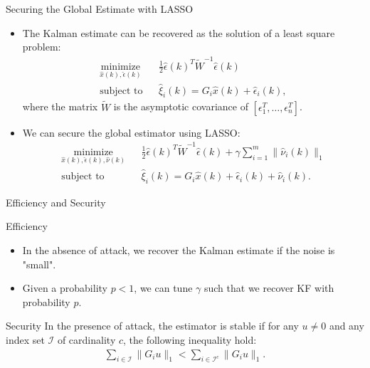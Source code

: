 \documentclass[10pt]{beamer}
\DeclareMathOperator{\1}{\textbf{1}}
\begin{document}
\begin{frame}{Securing the Global Estimate with LASSO}
  \begin{itemize}
    \item The Kalman estimate can be recovered as the solution of a least square problem:
      \begin{align*}
      &\mathop{\textrm{minimize}}\limits_{\hat x(k),\hat \epsilon(k)}&
      & \frac{1}{2}\hat \epsilon(k)^T \tilde W^{-1} \hat \epsilon(k)\\
      &\textrm{subject to} &
      &\hat \xi_i(k)  =  G_i\hat x(k) + \hat \epsilon_i(k),&
      \end{align*}
      where the matrix $\tilde W$ is the asymptotic covariance of $[\epsilon_1^T,\ldots ,\epsilon_n^T]$.
 
    \item We can secure the global estimator using LASSO:
      \begin{align*}
    &\mathop{\textrm{minimize}}\limits_{\hat x(k),\hat \epsilon(k), \hat \nu(k)}&
    & \frac{1}{2}\hat \epsilon(k)^T \tilde W^{-1} \hat \epsilon(k) + \gamma \sum_{i=1}^m \|\hat \nu_i(k)\|_1\\
    &\textrm{subject to} &
    &\hat \xi_i(k)  =  G_i\hat x(k) + \hat \epsilon_i(k)+\hat \nu_i(k).&
      \end{align*}
  \end{itemize}
\end{frame}

\begin{frame}{Efficiency and Security}
  \begin{block}{Efficiency}
    \begin{itemize}
      \item In the absence of attack, we recover the Kalman estimate if the noise is "small".
      \item Given a probability $p<1$, we can tune $\gamma$ such that we recover KF with probability $p$.
    \end{itemize}
  \end{block}
  \begin{block}{Security}
    In the presence of attack, the estimator is stable if for any $u\neq 0$ and any index set $\mathcal I$ of cardinality $c$, the following inequality hold:
    \begin{align*}
      \sum_{i\in \mathcal I} \|G_iu\|_1 < \sum_{i\in \mathcal I^c} \|G_iu\|_1. 
    \end{align*}
  \end{block}
\end{frame}
\end{document}
